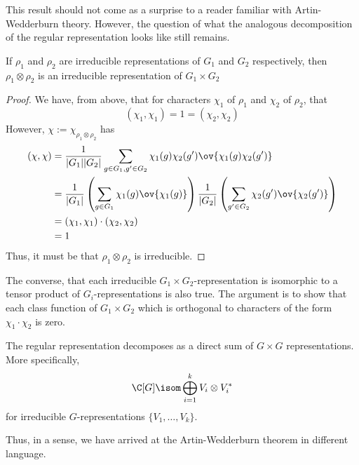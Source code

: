 \documentclass[11pt,leqno,oneside]{amsbook}
\numberwithin{thm}{section}
\begin{document}
\begin{rmk}
  This result should not come as a surprise to a reader familiar with
  Artin-Wedderburn theory. However, the question of what the
  analogous decomposition of the regular representation looks like
  still remains. 
\end{rmk}
\begin{lem}\label{tensor-of-irred-is-irred}
  If \(\rho_1\) and \(\rho_2\) are irreducible representations of
  \(G_1\) and \(G_2\) respectively, then
  \(\rho_1 \otimes \rho_2\) is an irreducible representation of \(G_1
  \times G_2\)
\end{lem}
\begin{proof}
  We have, from above, that for characters \(\chi_1\) of \(\rho_1\)
  and \(\chi_2\) of \(\rho_2\), that \[
    (\chi_1, \chi_1) = 1 = (\chi_2,\chi_2)
  \]
  However, \(\chi := \chi_{\rho_1 \otimes \rho_2}\) has
  \begin{align*}
    (\chi,\chi) & = 
    \frac{1}{|G_1||G_2|} \sum_{g \in G_1, g' \in G_2} \chi_1(g)
                  \chi_2(g') \ov{\chi_1(g) \chi_2(g')} \\
    & = \frac{1}{|G_1|} \left(
      \sum_{g \in G_1} \chi_1(g) \ov{\chi_1(g)} \right)
      \frac{1}{|G_2|} \left( 
      \sum_{g' \in G_2} \chi_2(g') \ov{\chi_2(g')} \right) \\
    & = (\chi_1, \chi_1) \cdot (\chi_2, \chi_2) \\
    & = 1
  \end{align*}
  Thus, it must be that \(\rho_1 \otimes \rho_2\) is irreducible.
\end{proof}
\begin{rmk}
  The converse, that each irreducible \(G_1 \times
  G_2\)-representation is isomorphic to a tensor product of
  \(G_i\)-representations is also true. The argument is to show that
  each class function of \(G_1 \times G_2\) which is orthogonal to
  characters of the form \(\chi_1 \cdot \chi_2\) is zero.
\end{rmk}
\begin{thm}
  The regular representation decomposes as a direct sum of \(G \times
  G\) representations. More specifically, \[
    \C[G] \isom \bigoplus_{i=1}^k V_i \otimes V_i^*
  \]
  for irreducible \(G\)-representations \(\{V_1, \ldots, V_k\}\).
\end{thm}
\begin{rmk}
  Thus, in a sense, we have arrived at the Artin-Wedderburn theorem in
  different language. 
\end{rmk}
\end{document}
